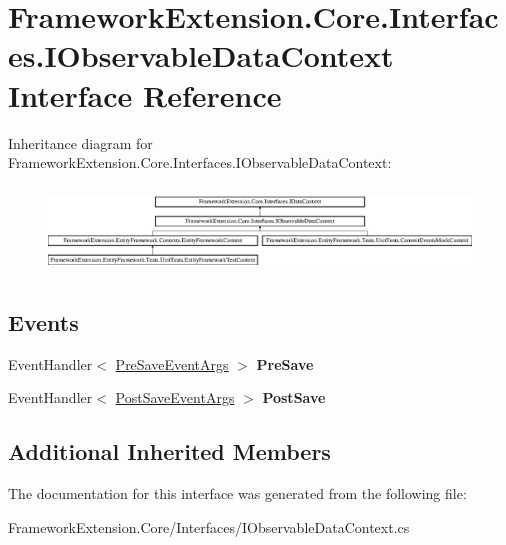 \hypertarget{interface_framework_extension_1_1_core_1_1_interfaces_1_1_i_observable_data_context}{\section{Framework\-Extension.\-Core.\-Interfaces.\-I\-Observable\-Data\-Context Interface Reference}
\label{interface_framework_extension_1_1_core_1_1_interfaces_1_1_i_observable_data_context}
}
Inheritance diagram for Framework\-Extension.\-Core.\-Interfaces.\-I\-Observable\-Data\-Context\-:\begin{figure}[H]
\begin{center}
\leavevmode
\includegraphics[height=2.309278cm]{interface_framework_extension_1_1_core_1_1_interfaces_1_1_i_observable_data_context}
\end{center}
\end{figure}
\subsection*{Events}
\begin{DoxyCompactItemize}
\item 
\hypertarget{interface_framework_extension_1_1_core_1_1_interfaces_1_1_i_observable_data_context_a1639996a55aaeb6001c8044561e1b3e3}{Event\-Handler$<$ \hyperlink{class_framework_extension_1_1_core_1_1_interceptors_1_1_events_1_1_pre_save_event_args}{Pre\-Save\-Event\-Args} $>$ {\bfseries Pre\-Save}}\label{interface_framework_extension_1_1_core_1_1_interfaces_1_1_i_observable_data_context_a1639996a55aaeb6001c8044561e1b3e3}

\item 
\hypertarget{interface_framework_extension_1_1_core_1_1_interfaces_1_1_i_observable_data_context_aee463e57933af818ce34fab005fbff96}{Event\-Handler$<$ \hyperlink{class_framework_extension_1_1_core_1_1_interceptors_1_1_events_1_1_post_save_event_args}{Post\-Save\-Event\-Args} $>$ {\bfseries Post\-Save}}\label{interface_framework_extension_1_1_core_1_1_interfaces_1_1_i_observable_data_context_aee463e57933af818ce34fab005fbff96}

\end{DoxyCompactItemize}
\subsection*{Additional Inherited Members}


The documentation for this interface was generated from the following file\-:\begin{DoxyCompactItemize}
\item 
Framework\-Extension.\-Core/\-Interfaces/I\-Observable\-Data\-Context.\-cs\end{DoxyCompactItemize}
